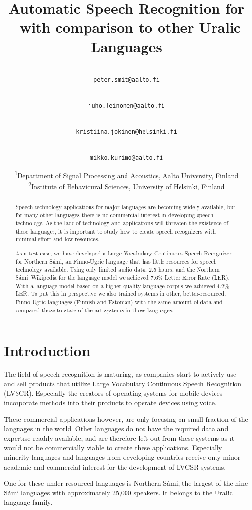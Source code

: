 \documentclass[b5paper]{article}
\title{Automatic Speech Recognition for \ns\ with comparison to other Uralic Languages\blfootnote{
    This work is licensed under a Creative Commons Attribution–NoDerivatives
    4.0 International Licence.  Licence details:
    \url{http://creativecommons.org/licenses/by-nd/4.0/}
}}
\author{
\makebox[.45\linewidth]{Peter Smit\textsuperscript{1}}\\
\texttt{peter.smit@aalto.fi}
\\
\and 
\makebox[.45\linewidth]{Juho Leinonen\textsuperscript{1}}\\
\texttt{juho.leinonen@aalto.fi}
\\
\and 
\makebox[.45\linewidth]{Kristiina Jokinen\textsuperscript{2}}\\
\texttt{kristiina.jokinen@helsinki.fi}
\and
\makebox[.45\linewidth]{Mikko Kurimo\textsuperscript{1}}\\ 
\texttt{mikko.kurimo@aalto.fi}
\\ 
\and
\small\textsuperscript{1}Department of Signal Processing and Acoustics, Aalto University, Finland \\
\small\textsuperscript{2}Institute of Behavioural Sciences, University of Helsinki, Finland\\
}
\newcommand{\ns}{Northern Sámi}
\begin{document}
\maketitle

\begin{abstract} 
Speech technology applications for major languages are becoming widely available, but for many other languages there is no commercial interest in developing speech technology. As the lack of technology and applications will threaten the existence of these languages, it is important to study how to create speech recognizers with minimal effort and low resources.

As a test case, we have developed a Large Vocabulary Continuous Speech Recognizer for \ns, an Finno-Ugric language that has little resources for speech technology available. Using only limited audio data, 2.5 hours, and the \ns\ Wikipedia for the language model we achieved 7.6\% Letter Error Rate (LER). With a language model based on a higher quality language corpus we achieved 4.2\% LER. To put this in perspective we also trained systems in other, better-resourced, Finno-Ugric languages (Finnish and Estonian) with the same amount of data and compared those to state-of-the art systems in those languages. 
\end{abstract}

\section{Introduction}

The field of speech recognition is maturing, as companies start to actively use and sell products that utilize Large Vocabulary Continuous Speech Recognition (LVSCR). Especially the creators of operating systems for mobile devices incorporate methods into their products to operate devices using voice.

These commercial applications however, are only focusing on small fraction of the languages in the world. Other languages do not have the required data and expertise readily available, and are therefore left out from these systems as it would not be commercially viable to create these applications. Especially minority languages and languages from developing countries receive only minor academic and commercial interest for the development of LVCSR systems. \cite{besacier2014automatic}

One for these under-resourced languages is \ns, the largest of the nine Sámi languages with approximately 25,000 speakers. It belongs to the Uralic language family. \cite{ethno18}
\end{document}
